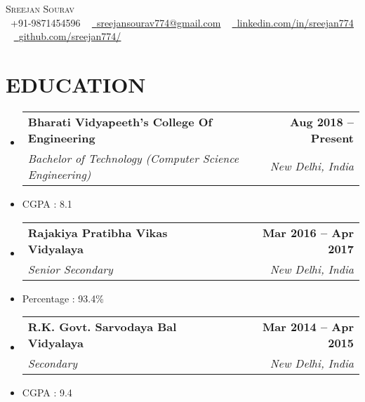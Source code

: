 \documentclass[letterpaper,11pt]{article}
\makeatletter
\newcommand{\resumeItem}[1]{
  \item\small{
    {#1 \vspace{-2pt}}
  }
}
\newcommand{\resumeSubheading}[4]{
  \vspace{-2pt}\item
    \begin{tabular*}{1.0\textwidth}[t]{l@{\extracolsep{\fill}}r}
      \textbf{#1} & \textbf{\small #2} \\
      \textit{\small#3} & \textit{\small #4} \\
    \end{tabular*}\vspace{-7pt}
}
\newcommand{\resumeSubHeadingListStart}{\begin{itemize}[leftmargin=0.0in, label={}]}
\newcommand{\resumeSubHeadingListEnd}{\end{itemize}}
\makeatother
\begin{document}

\begin{center}
    {\Huge \scshape Sreejan Sourav} \\ \vspace{1pt}  \vspace{5mm}
    \small \raisebox{-0.1\height}\faPhone\ +91-9871454596 ~ \href{mailto:sreejansourav774@gmail.com}{\raisebox{-0.2\height}\faEnvelope\  \underline{sreejansourav774@gmail.com}} ~ 
    \href{https://linkedin.com/in/sreejan774/}{\raisebox{-0.2\height}\faLinkedin\ \underline{linkedin.com/in/sreejan774}}  ~
    \href{https://github.com/sreejan774/}{\raisebox{-0.2\height}\faGithub\ \underline{github.com/sreejan774/}}
    \vspace{-8pt}
\end{center}

\vspace{3 mm}
\section{EDUCATION}
  \resumeSubHeadingListStart
    \resumeSubheading
      {Bharati Vidyapeeth's College Of Engineering}{Aug 2018 -- Present}
      {Bachelor of Technology (Computer Science Engineering)}{New Delhi, India}
      \resumeItem{CGPA : 8.1}
  
    \resumeSubheading
      {Rajakiya Pratibha Vikas Vidyalaya}{Mar 2016 -- Apr 2017}
      {Senior Secondary}{New Delhi, India} 
      \resumeItem{Percentage : 93.4\%}
    
    \resumeSubheading
      {R.K. Govt. Sarvodaya Bal Vidyalaya}{Mar 2014 -- Apr 2015}
      {Secondary}{New Delhi, India}
      \resumeItem{CGPA : 9.4}
  \resumeSubHeadingListEnd
\end{document}
